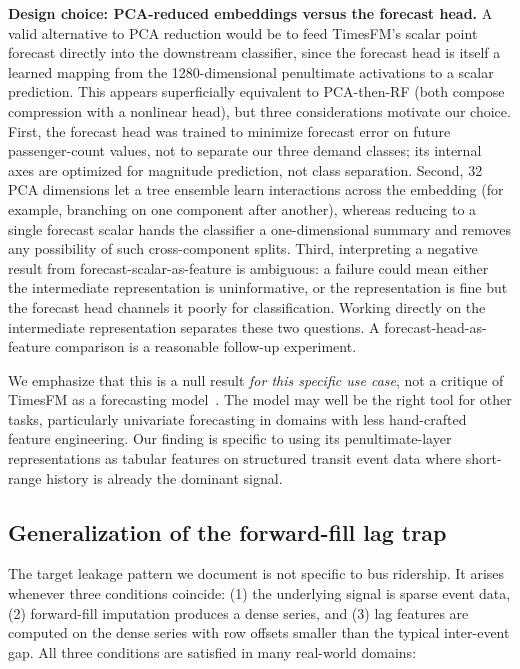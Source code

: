 \textbf{Design choice: PCA-reduced embeddings versus the forecast head.}
A valid alternative to PCA reduction would be to feed TimesFM's scalar
point forecast directly into the downstream classifier, since the
forecast head is itself a learned mapping from the 1280-dimensional
penultimate activations to a scalar prediction. This appears
superficially equivalent to PCA-then-RF (both compose compression with
a nonlinear head), but three considerations motivate our choice. First,
the forecast head was trained to minimize forecast error on future
passenger-count values, not to separate our three demand classes; its
internal axes are optimized for magnitude prediction, not class
separation. Second, 32 PCA dimensions let a tree ensemble learn
interactions across the embedding (for example, branching on one
component after another), whereas reducing to a single forecast scalar
hands the classifier a one-dimensional summary and removes any
possibility of such cross-component splits. Third, interpreting a
negative result from forecast-scalar-as-feature is ambiguous: a failure
could mean either the intermediate representation is uninformative, or
the representation is fine but the forecast head channels it poorly for
classification. Working directly on the intermediate representation
separates these two questions. A forecast-head-as-feature comparison is
a reasonable follow-up experiment.

We emphasize that this is a null result \emph{for this specific use case},
not a critique of TimesFM as a forecasting model~\cite{das2024timesfm}. The
model may well be the right tool for other tasks, particularly univariate
forecasting in domains with less hand-crafted feature engineering. Our
finding is specific to using its penultimate-layer representations as
tabular features on structured transit event data where short-range history
is already the dominant signal.

\subsection{Generalization of the forward-fill lag trap}

The target leakage pattern we document is not specific to bus ridership. It
arises whenever three conditions coincide: (1) the underlying signal is
sparse event data, (2) forward-fill imputation produces a dense series, and
(3) lag features are computed on the dense series with row offsets
smaller than the typical inter-event gap. All three conditions are
satisfied in many real-world domains:

